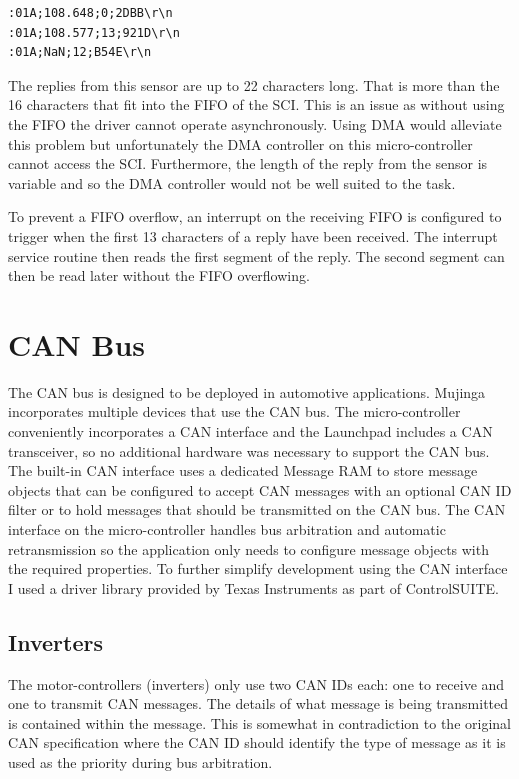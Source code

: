 \begin{verbatim}
:01A;108.648;0;2DBB\r\n
:01A;108.577;13;921D\r\n
:01A;NaN;12;B54E\r\n
\end{verbatim}

The replies from this sensor are up to 22 characters long. That is more than the 16 characters that fit into the FIFO of the SCI. This is an issue as without using the FIFO the driver cannot operate asynchronously. Using DMA would alleviate this problem but unfortunately the DMA controller on this micro-controller cannot access the SCI. Furthermore, the length of the reply from the sensor is variable and so the DMA controller would not be well suited to the task.

To prevent a FIFO overflow, an interrupt on the receiving FIFO is configured to trigger when the first 13 characters of a reply have been received. The interrupt service routine then reads the first segment of the reply. The second segment can then be read later without the FIFO overflowing.

\section{CAN Bus}

The CAN bus is designed to be deployed in automotive applications. Mujinga incorporates multiple devices that use the CAN bus. The micro-controller conveniently incorporates a CAN interface and the Launchpad includes a CAN transceiver, so no additional hardware was necessary to support the CAN bus. The built-in CAN interface uses a dedicated Message RAM to store message objects that can be configured to accept CAN messages with an optional CAN ID filter or to hold messages that should be transmitted on the CAN bus. The CAN interface on the micro-controller handles bus arbitration and automatic retransmission so the application only needs to configure message objects with the required properties. To further simplify development using the CAN interface I used a driver library provided by Texas Instruments as part of ControlSUITE\cite{controlsuite}.

\subsection{Inverters}

The motor-controllers (inverters) only use two CAN IDs each: one to receive and one to transmit CAN messages. The details of what message is being transmitted is contained within the message. This is somewhat in contradiction to the original CAN specification where the CAN ID should identify the type of message as it is used as the priority during bus arbitration.

